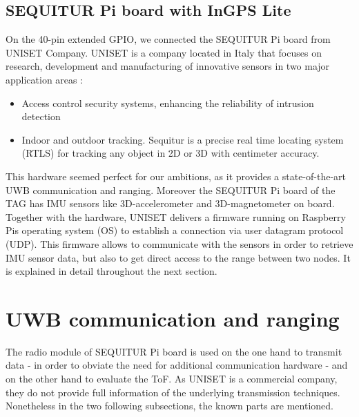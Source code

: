 \subsection{SEQUITUR Pi board with InGPS Lite}
On the 40-pin extended GPIO, we connected the SEQUITUR Pi board from UNISET Company. UNISET is a company located in Italy that focuses on research, development and manufacturing of innovative sensors in two major application areas \cite{Uniset}:

\begin{itemize}
\item Access control security systems, enhancing the reliability of intrusion detection
\item Indoor and outdoor tracking. Sequitur is a precise real time locating system (RTLS) for tracking any object in 2D or 3D with centimeter accuracy.
\end{itemize}

This hardware seemed perfect for our ambitions, as it provides a state-of-the-art UWB communication and ranging. Moreover the SEQUITUR Pi board of the TAG has IMU sensors like 3D-accelerometer and 3D-magnetometer on board. Together with the hardware, UNISET delivers a firmware running on Raspberry Pis operating system (OS) to establish a connection via user datagram protocol (UDP). This firmware allows to communicate with the sensors in order to retrieve IMU sensor data, but also to get direct access to the range between two nodes. It is explained in detail throughout the next section. 


\section{UWB communication and ranging}
The radio module of SEQUITUR Pi board is used on the one hand to transmit data - in order to obviate the need for additional communication hardware - and on the other hand to evaluate the ToF. As UNISET is a commercial company, they do not provide full information of the underlying transmission techniques. Nonetheless in the two following subsections, the known parts are mentioned.

